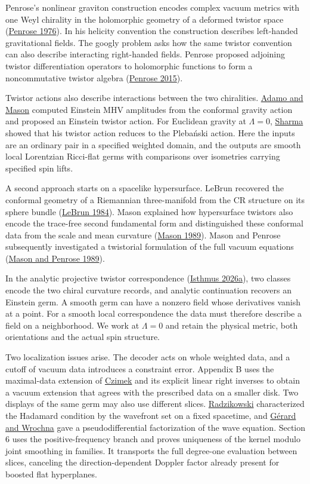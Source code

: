 \documentclass[
  english,
  11pt,
  reqno]{amsart}
\begin{document}
Penrose's nonlinear graviton construction encodes complex vacuum metrics
with one Weyl chirality in the holomorphic geometry of a deformed
twistor space (\hyperref[ref-Penrose1976]{Penrose 1976}). In his
helicity convention the construction describes left-handed gravitational
fields. The googly problem asks how the same twistor convention can also
describe interacting right-handed fields. Penrose proposed adjoining
twistor differentiation operators to holomorphic functions to form a
noncommutative twistor algebra (\hyperref[ref-Penrose2015]{Penrose
2015}).

Twistor actions also describe interactions between the two chiralities.
\hyperref[ref-AdamoMason2014]{Adamo and Mason} computed Einstein MHV
amplitudes from the conformal gravity action and proposed an Einstein
twistor action. For Euclidean gravity at \(\Lambda=0\),
\hyperref[ref-Sharma2021]{Sharma} showed that his twistor action reduces
to the Plebański action. Here the inputs are an ordinary pair in a
specified weighted domain, and the outputs are smooth local Lorentzian
Ricci-flat germs with comparisons over isometries carrying specified
spin lifts.

A second approach starts on a spacelike hypersurface. LeBrun recovered
the conformal geometry of a Riemannian three-manifold from the CR
structure on its sphere bundle (\hyperref[ref-LeBrun1984]{LeBrun 1984}).
Mason explained how hypersurface twistors also encode the trace-free
second fundamental form and distinguished these conformal data from the
scale and mean curvature (\hyperref[ref-Mason1989]{Mason 1989}). Mason
and Penrose subsequently investigated a twistorial formulation of the
full vacuum equations (\hyperref[ref-MasonPenrose1989]{Mason and Penrose
1989}).

In the analytic projective twistor correspondence
(\hyperref[ref-IsthmusLocal2026]{Isthmus 2026a}), two classes encode the
two chiral curvature records, and analytic continuation recovers an
Einstein germ. A smooth germ can have a nonzero field whose derivatives
vanish at a point. For a smooth local correspondence the data must
therefore describe a field on a neighborhood. We work at \(\Lambda=0\)
and retain the physical metric, both orientations and the actual spin
structure.

Two localization issues arise. The decoder acts on whole weighted data,
and a cutoff of vacuum data introduces a constraint error. Appendix B
uses the maximal-data extension of \hyperref[ref-Czimek2018]{Czimek} and
its explicit linear right inverses to obtain a vacuum extension that
agrees with the prescribed data on a smaller disk. Two displays of the
same germ may also use different slices.
\hyperref[ref-Radzikowski1996]{Radzikowski} characterized the Hadamard
condition by the wavefront set on a fixed spacetime, and
\hyperref[ref-gerard-wrochna2014]{Gérard and Wrochna} gave a
pseudodifferential factorization of the wave equation. Section 6 uses
the positive-frequency branch and proves uniqueness of the kernel modulo
joint smoothing in families. It transports the full degree-one
evaluation between slices, canceling the direction-dependent Doppler
factor already present for boosted flat hyperplanes.
\end{document}
